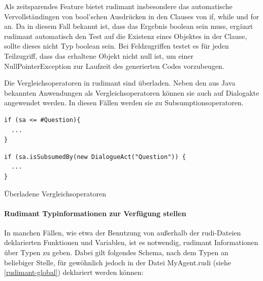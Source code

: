 Als zeitsparendes Feature bietet rudimant insbesondere das automatische
Vervollständingen von bool'schen Ausdrücken in den Clauses von if, while und
for an. Da in diesem Fall bekannt ist, dass das Ergebnis boolean sein muss,
ergänzt rudimant automatisch den Test auf die Existenz eines Objektes in der
Clause, sollte dieses nicht Typ boolean sein. Bei Feldzugriffen testet es für
jeden Teilzugriff, dass das erhaltene Objekt nicht null ist, um einer
NullPointerException zur Laufzeit des generierten Codes vorzubeugen.

Die Vergleichsoperatoren in rudimant sind überladen. Neben den aus Java bekannten Anwendungen als Vergleichsoperatoren können sie auch auf Dialogakte angewendet werden. In diesen Fällen werden sie zu Subsumptionsoperatoren.

\begin{table}[htbp]
  \centering
  \begin{footnotesize}
    \begin{minipage}{0.3\textwidth}
\begin{verbatim}
if (sa <= #Question){
  ...
}
\end{verbatim}
    \end{minipage}
    \begin{minipage}{0.5\textwidth}
\begin{verbatim}
if (sa.isSubsumedBy(new DialogueAct("Question")) {
  ...
}
\end{verbatim}
    \end{minipage}
  \end{footnotesize}

  \caption{Überladene Vergleichsoperatoren}
  \label{tab:overloaded-comparison}
\end{table}

\paragraph{Rudimant Typinformationen zur Verfügung stellen}

In manchen Fällen, wie etwa der Benutzung von außerhalb der rudi-Dateien
deklarierten Funktionen und Variablen, ist es notwendig, rudimant Informationen
über Typen zu geben. Dabei gilt folgendes Schema, nach dem Typen an beliebiger
Stelle, für gewöhnlich jedoch in der Datei MyAgent.rudi (siehe
\ref{rudimant-global}) deklariert werden können:



